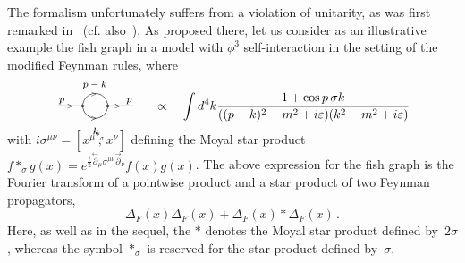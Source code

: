 \documentclass[a4paper,twoside,12pt]{article}
\begin{document}
The formalism unfortunately suffers from a violation of unitarity, as was first
remarked in~\cite{gomis} (cf. also~\cite{alvarez,luk}). As proposed 
there, let us consider as an illustrative example the fish graph
in a model with $\phi^3$ self-interaction in the setting of the modified
Feynman rules, where
$$
\begin{picture}(70,23)(-3,10)
\put(00,13){\line(3,0){20}}
\put(20,13){\circle{2}}
\put(40,13){\circle{2}}
\put(40,13){\line(3,0){20}}
\put(30,13){\circle{20}}
\put(1,16){\footnotesize{$p$}}
\put(20,28){\footnotesize{$p-k$}}
\put(28,-10){\footnotesize{$k$}}
\put(55,16){\footnotesize{$p$}}
\put(7,11.5){\tiny{$>$}}
\put(45,11.5){\tiny{$>$}}
\put(26,21.25){\tiny{$>$}}
\put(26,1.75){\tiny{$>$}}
\end{picture}
\quad\propto\quad 
\int d^4k \frac{1+\cos p \,\sigma
k}{((p-k)^2-m^2+i\varepsilon)(k^2-m^2+i\varepsilon)}
$$
with $i\sigma^{\mu\nu}=[x^\mu \stackrel{\displaystyle*_\sigma}{,} x^\nu]$
defining the Moyal star product $f*_\sigma g(x)=
e^{\frac{i}{2}\stackrel{\leftarrow}{\partial}_\mu\sigma^{\mu\nu}
\stackrel{\rightarrow}{\partial}_\nu}f(x)g(x)$. 
The above expression for the fish graph is the Fourier transform of a pointwise
product and a star product of two Feynman propagators,
$$
\Delta_F(x)\Delta_F(x)+
\Delta_F(x)*\Delta_F(x)\,.
$$
Here, as well as in the sequel,
the $*$ denotes the Moyal star product defined by~$2\sigma$, whereas the
symbol $*_\sigma$ is reserved for the star product defined by~$\sigma$.
\end{document}
